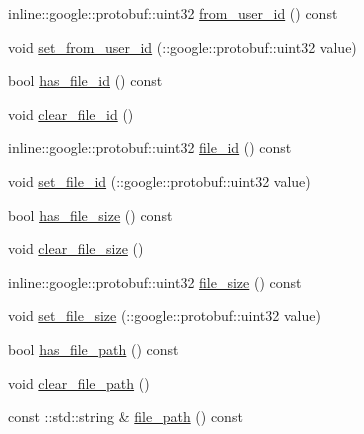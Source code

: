 \begin{DoxyCompactItemize}
\item 
inline\+::google\+::protobuf\+::uint32 \hyperlink{class_i_m_1_1_base_define_1_1_server_offline_file_info_a5d141e4e8769687e59a00307c8c57c2b}{from\+\_\+user\+\_\+id} () const 
\item 
void \hyperlink{class_i_m_1_1_base_define_1_1_server_offline_file_info_a1479639f168ce7f0f59bd045e0f8f348}{set\+\_\+from\+\_\+user\+\_\+id} (\+::google\+::protobuf\+::uint32 value)
\item 
bool \hyperlink{class_i_m_1_1_base_define_1_1_server_offline_file_info_aef5b4e1ef1ddf8e776dd103b26c71fac}{has\+\_\+file\+\_\+id} () const 
\item 
void \hyperlink{class_i_m_1_1_base_define_1_1_server_offline_file_info_a7d5cbf02c20cceb271f85df26483a43d}{clear\+\_\+file\+\_\+id} ()
\item 
inline\+::google\+::protobuf\+::uint32 \hyperlink{class_i_m_1_1_base_define_1_1_server_offline_file_info_a25a0bf2a170f37ec05c2fcd59c00e003}{file\+\_\+id} () const 
\item 
void \hyperlink{class_i_m_1_1_base_define_1_1_server_offline_file_info_a6a1785180a118c0073e3aab440a1f717}{set\+\_\+file\+\_\+id} (\+::google\+::protobuf\+::uint32 value)
\item 
bool \hyperlink{class_i_m_1_1_base_define_1_1_server_offline_file_info_ab592548b549178f2b013d0ae4f7592a7}{has\+\_\+file\+\_\+size} () const 
\item 
void \hyperlink{class_i_m_1_1_base_define_1_1_server_offline_file_info_af580bb2054e6f31ac967b5fdbf7ad904}{clear\+\_\+file\+\_\+size} ()
\item 
inline\+::google\+::protobuf\+::uint32 \hyperlink{class_i_m_1_1_base_define_1_1_server_offline_file_info_a3c7e8d3dce736c7c9ada991485edc178}{file\+\_\+size} () const 
\item 
void \hyperlink{class_i_m_1_1_base_define_1_1_server_offline_file_info_aa68a025e03fc96d0dd115b34afc3a931}{set\+\_\+file\+\_\+size} (\+::google\+::protobuf\+::uint32 value)
\item 
bool \hyperlink{class_i_m_1_1_base_define_1_1_server_offline_file_info_a8bd145098783a48af061cd9e6ff9ce85}{has\+\_\+file\+\_\+path} () const 
\item 
void \hyperlink{class_i_m_1_1_base_define_1_1_server_offline_file_info_af77d08e871f871e5f1cba3ac75db6584}{clear\+\_\+file\+\_\+path} ()
\item 
const \+::std\+::string \& \hyperlink{class_i_m_1_1_base_define_1_1_server_offline_file_info_a356267794635afda3f373d66e91f91bc}{file\+\_\+path} () const 

\end{DoxyCompactItemize}
